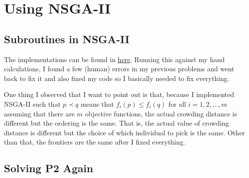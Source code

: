 \section{Using NSGA-II}

\subsection{Subroutines in NSGA-II}

The implementations can be found in \href{https://github.com/nngerncham/ma395_heuristic/blob/main/homework/hw5/code/codebase/nsga2.py}{here}. Running this against my hand calculations, I found a few (human) errors in my previous problems and went back to fix it and also fixed my code so I basically needed to fix everything.

One thing I observed that I want to point out is that, because I implemented NSGA-II such that \(p \prec q\) means that \(f_i(p) \leq f_i(q)\) for all \(i = 1, 2, ..., m\) assuming that there are \(m\) objective functions, the actual crowding distance is different but the ordering is the same. That is, the actual value of crowding distance is different but the choice of which individual to pick is the same. Other than that, the frontiers are the same after I fixed everything.

\subsection{Solving P2 Again}

